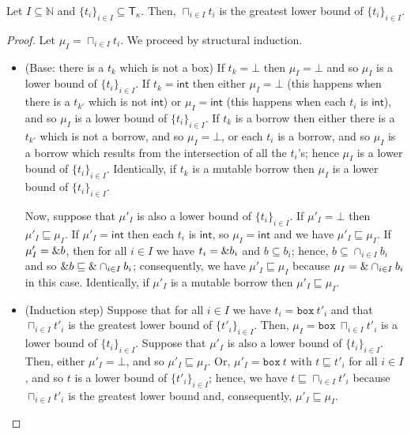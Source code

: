 \begin{lemma}\label{lemma:glb-type}
  Let $I\subseteq\mathbb{N}$ and $\{t_i\}_{i\in I}\subseteq\mathsf{T}_\kappa$.
  Then, $\sqcap_{i\in I}t_i$ is the greatest lower bound of $\{t_i\}_{i\in I}$.
\end{lemma}
\begin{proof}
  Let $\mu_I = \sqcap_{i\in I}t_i$.
  We proceed by structural induction.
  \begin{itemize}
    \item (Base: there is a $t_k$ which is not a box)
    If $t_k=\bot$ then $\mu_I=\bot$ and so $\mu_I$ is a lower bound of
    $\{t_i\}_{i\in I}$.
    If $t_k=\mathsf{int}$ then either $\mu_I=\bot$ (this happens when
    there is a $t_{k'}$ which is not $\mathsf{int}$) or $\mu_I=\mathsf{int}$
    (this happens when each $t_i$ is $\mathsf{int}$), and so
    $\mu_I$ is a lower bound of $\{t_i\}_{i\in I}$.
    If $t_k$ is a borrow then either there is a $t_{k'}$ which is not a borrow,
    and so $\mu_I=\bot$, or each $t_i$ is a borrow, and so $\mu_I$ is
    a borrow which results from the intersection of all the $t_i$'s; hence
    $\mu_I$ is a lower bound of $\{t_i\}_{i\in I}$.
    Identically, if $t_k$ is a mutable borrow then $\mu_I$ is a lower bound
    of $\{t_i\}_{i\in I}$.

    Now, suppose that $\mu'_I$ is also a lower bound of $\{t_i\}_{i\in I}$.
    If $\mu'_I=\bot$ then $\mu'_I\sqsubseteq\mu_I$.
    If $\mu'_I=\mathsf{int}$ then each $t_i$ is $\mathsf{int}$, so
    $\mu_I=\mathsf{int}$ and we have $\mu'_I\sqsubseteq\mu_I$.
    If $\mu'_I=\& b$, then for all $i\in I$ we have $t_i = \& b_i$
    and $b \subseteq b_i$; hence, $b \subseteq \cap_{i\in I}b_i$ and so
    $\& b \sqsubseteq \&\cap_{i\in I}b_i$; consequently, we have
    $\mu'_I\sqsubseteq\mu_I$ because $\mu_I=\&\cap_{i\in I}b_i$ in this case.
    Identically, if $\mu'_I$ is a mutable borrow then $\mu'_I\sqsubseteq\mu_I$.
    \item (Induction step) Suppose that for all $i\in I$ we have
    $t_i = \mathtt{box}\ t'_i$ and that $\sqcap_{i\in I}t'_i$ is the greatest
    lower bound of $\{t'_i\}_{i\in I}$. Then,
    $\mu_I = \mathtt{box}\ \sqcap_{i\in I}t'_i$ is a lower bound
    of $\{t_i\}_{i\in I}$. Suppose that $\mu'_I$ is also a lower bound
    of $\{t_i\}_{i\in I}$. Then, either $\mu'_I=\bot$, and so
    $\mu'_I\sqsubseteq\mu_I$. Or, $\mu'_I=\mathtt{box}\ t$ with
    $t\sqsubseteq t'_i$ for all $i\in I$, and so $t$ is a lower bound
    of $\{t'_i\}_{i\in I}$; hence, we have $t\sqsubseteq \sqcap_{i\in I}t'_i$
    because $\sqcap_{i\in I}t'_i$ is the greatest lower bound and,
    consequently, $\mu'_I\sqsubseteq\mu_I$.
  \end{itemize}
\end{proof}

